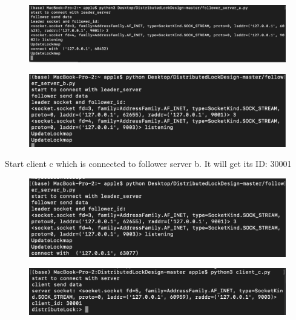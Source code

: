 \documentclass[10pt]{article}
\begin{document}
\begin{figure}[H]
\centerline{\includegraphics[width = 1\textwidth]{screenshot//follower_a_04.png}}
\end{figure}

\begin{figure}[H]
\centerline{\includegraphics[width = 1\textwidth]{screenshot//follower_b_03.png}}
\end{figure}



Start client c which is connected to follower server b. It will get its ID: 30001

\begin{figure}[H]
\centerline{\includegraphics[width = 1\textwidth]{screenshot//follower_b_04.png}}
\end{figure}

\begin{figure}[H]
\centerline{\includegraphics[width = 1\textwidth]{screenshot//client_07.png}}
\end{figure}
\end{document}
